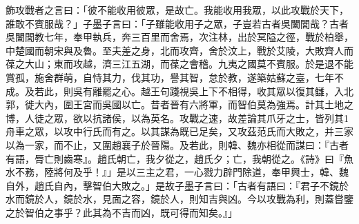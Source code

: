 \begin{pinyinscope}
飾攻戰者之言曰：「彼不能收用彼眾，是故亡。我能收用我眾，以此攻戰於天下，誰敢不賓服哉？」子墨子言曰：「子雖能收用子之眾，子豈若古者吳闔閭哉？古者吳闔閭教七年，奉甲執兵，奔三百里而舍焉，次注林，出於冥隘之徑，戰於柏舉，中楚國而朝宋與及魯。至夫差之身，北而攻齊，舍於汶上，戰於艾陵，大敗齊人而葆之大山；東而攻越，濟三江五湖，而葆之會稽。九夷之國莫不賓服。於是退不能賞孤，施舍群萌，自恃其力，伐其功，譽其智，怠於教，遂築姑蘇之臺，七年不成。及若此，則吳有離罷之心。越王句踐視吳上下不相得，收其眾以復其讎，入北郭，徙大內，圍王宮而吳國以亡。昔者晉有六將軍，而智伯莫為強焉。計其土地之博，人徒之眾，欲以抗諸侯，以為英名。攻戰之速，故差論其爪牙之士，皆列其1舟車之眾，以攻中行氏而有之。以其謀為既已足矣，又攻茲范氏而大敗之，并三家以為一家，而不止，又圍趙襄子於晉陽。及若此，則韓、魏亦相從而謀曰：『古者有語，脣亡則齒寒』。趙氏朝亡，我夕從之，趙氏夕；亡，我朝從之。《詩》曰『魚水不務，陸將何及乎！』」是以三主之君，一心戮力辟門除道，奉甲興士，韓、魏自外，趙氏自內，擊智伯大敗之。」是故子墨子言曰：「古者有語曰：『君子不鏡於水而鏡於人，鏡於水，見面之容，鏡於人，則知吉與凶。今以攻戰為利，則蓋嘗鑒之於智伯之事乎？此其為不吉而凶，既可得而知矣。』」


\end{pinyinscope}